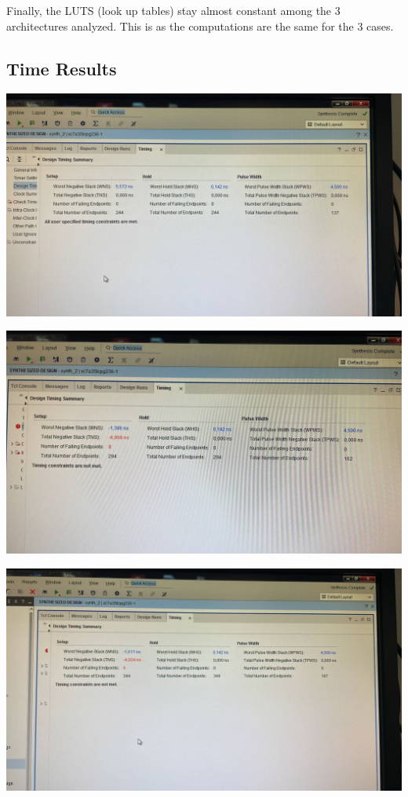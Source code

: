 \documentclass[a4paper, 12pt]{article}
\begin{document}
Finally, the LUTS (look up tables) stay almost constant among the 3 architectures analyzed. This is as the computations are the same for the 3 cases.
\subsection{Time Results}
\label{sec:org56a04bc}
\begin{center}
\includegraphics[width=.9\linewidth]{./img/time_report_parallel.jpg}
\end{center}

\begin{center}
\includegraphics[width=.9\linewidth]{./img/time_report_pipeline_simple.jpg}
\end{center}

\begin{center}
\includegraphics[width=.9\linewidth]{./img/time_report_pipeline.jpg}
\end{center}
\end{document}
